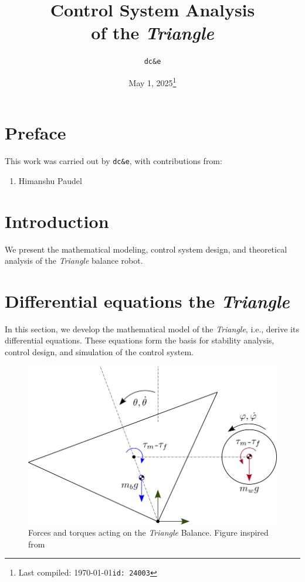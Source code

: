 \documentclass{article}
\title{Control System Analysis\\of the \textit{Triangle}}
\author{\texttt{dc\&e}}
\date{May 1, 2025\footnote{Last compiled: \today\hfill\texttt{id: 24003}}}
\begin{document}
\maketitle

\tableofcontents


\newpage

\section*{Preface}

This work was carried out by \texttt{dc\&e}, with contributions from:

\begin{enumerate}
  \item Himanshu Paudel
\end{enumerate}

\newpage

\section{Introduction}

We present the mathematical modeling, control system design, and theoretical analysis of the \textit{Triangle} balance robot.

\section{Differential equations the \textit{Triangle}}

In this section, we develop the mathematical model of the \textit{Triangle}, i.e., derive its differential equations. These equations form the basis for stability analysis, control design, and simulation of the control system.

\begin{figure}[ht]
  \centering
  \includegraphics[scale=0.4]{triangle.png}
  \caption{Forces and torques acting on the \textit{Triangle} Balance. Figure inspired from \cite{ipendulum}}
  \label{fig_triangle}
\end{figure}
\end{document}
